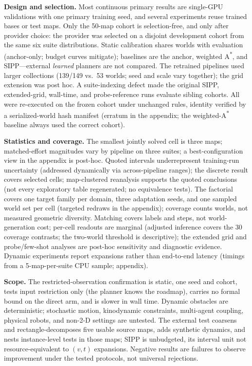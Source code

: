\documentclass[letterpaper]{article} %
\begin{document}
\textbf{Design and selection.} Most continuous primary results are single-GPU validations with one primary training seed, and several experiments reuse trained bases or test maps. Only the 50-map cohort is selection-free, and only after provider choice: the provider was selected on a disjoint development cohort from the same six suite distributions. Static calibration shares worlds with evaluation (anchor-only; budget curves mitigate); baselines are the anchor, weighted A\textsuperscript{*}, and SIPP---external \emph{learned} planners are not compared. The retrained pipelines used larger collections (139/149 vs.\ 53 worlds; seed and scale vary together); the grid extension was post hoc. A suite-indexing defect made the original SIPP, extended-grid, wall-time, and probe-reference runs evaluate sibling cohorts. All were re-executed on the frozen cohort under unchanged rules, identity verified by a serialized-world hash manifest (erratum in the appendix; the weighted-A\textsuperscript{*} baseline always used the correct cohort).

\textbf{Statistics and coverage.} The smallest jointly solved cell is three maps; matched-effort magnitudes vary by pipeline on three suites; a best-configuration view in the appendix is post-hoc. Quoted intervals underrepresent training-run uncertainty (addressed dynamically via across-pipeline ranges); the discrete result covers selected cells; map-clustered reanalysis supports the quoted conclusions (not every exploratory table regenerated; no equivalence tests). The factorial covers one target family per domain, three adaptation seeds, and one sampled world set per cell (targeted redraws in the appendix); coverage counts worlds, not measured geometric diversity. Matching covers labels and steps, not world-generation cost; per-cell readouts are marginal (adjusted inference covers the 30 coverage contrasts; the two-world threshold is descriptive); the extended grid and probe/few-shot analyses are post-hoc sensitivity and diagnostic evidence. Dynamic experiments report expansions rather than end-to-end latency (timings from a 5-map-per-suite CPU sample; appendix).

\textbf{Scope.} The restricted-observation confirmation is static, one seed and cohort, tests input restriction only (the planner knows the roadmap), carries no formal bound on the direct arm, and is slower in wall time. Dynamic obstacles are deterministic; stochastic motion, kinodynamic constraints, multi-agent coupling, physical robots, and non-2-D settings are untested. The external test coarsens and rectangle-decomposes five usable source maps, adds synthetic dynamics, and nests instance-level tests in those maps; SIPP is unbudgeted, its interval unit not resource-equivalent to $(v,t)$ expansions. Negative results are failures to observe improvement under the tested protocols, not universal rejections.
\end{document}
